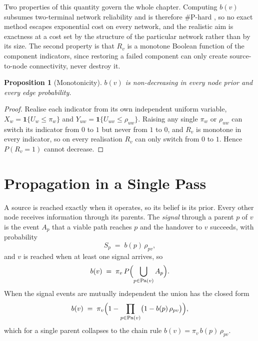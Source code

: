 \documentclass[12pt]{report}
\newtheorem{proposition}[theorem]{Proposition}
\begin{document}
Two properties of this quantity govern the whole chapter. Computing $b(v)$ subsumes two-terminal network reliability and is therefore \#P-hard \cite{valiant1979complexity,ball1986computational}, so no exact method escapes exponential cost on every network, and the realistic aim is exactness at a cost set by the structure of the particular network rather than by its size. The second property is that $R_v$ is a monotone Boolean function of the component indicators, since restoring a failed component can only create source-to-node connectivity, never destroy it.

\begin{proposition}[Monotonicity]
\label{prop:pp-monotone}
$b(v)$ is non-decreasing in every node prior and every edge probability.
\end{proposition}

\begin{proof}
Realise each indicator from its own independent uniform variable, $X_w = \mathbf{1}\{U_w \le \pi_w\}$ and $Y_{uw} = \mathbf{1}\{U_{uw} \le \rho_{uw}\}$. Raising any single $\pi_w$ or $\rho_{uw}$ can switch its indicator from $0$ to $1$ but never from $1$ to $0$, and $R_v$ is monotone in every indicator, so on every realisation $R_v$ can only switch from $0$ to $1$. Hence $P(R_v = 1)$ cannot decrease.
\end{proof}

\section{Propagation in a Single Pass}
\label{sec:pp-pass}

A source is reached exactly when it operates, so its belief is its prior. Every other node receives information through its parents. The \emph{signal} through a parent $p$ of $v$ is the event $A_p$ that a viable path reaches $p$ and the handover to $v$ succeeds, with probability
\begin{equation}
\label{eq:pp-signal}
S_p \;=\; b(p)\,\rho_{pv},
\end{equation}
and $v$ is reached when at least one signal arrives, so
\begin{equation}
\label{eq:pp-union}
b(v) \;=\; \pi_v \, P\Bigl(\bigcup_{p \in \mathrm{Pa}(v)} A_p\Bigr).
\end{equation}
When the signal events are mutually independent the union has the closed form
\begin{equation}
\label{eq:pp-independent}
b(v) \;=\; \pi_v \Bigl( 1 - \prod_{p \in \mathrm{Pa}(v)} \bigl( 1 - b(p)\,\rho_{pv} \bigr) \Bigr),
\end{equation}
which for a single parent collapses to the chain rule $b(v) = \pi_v\, b(p)\, \rho_{pv}$.
\end{document}
